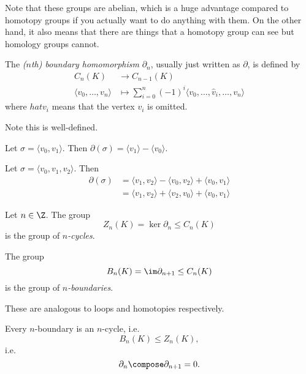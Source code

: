 \documentclass[a4paper]{article}
\renewcommand{\b}{\partial} %
\begin{document}
\begin{remark}
  Note that these groups are abelian, which is a huge advantage compared to homotopy groups if you actually want to do anything with them. On the other hand, it also means that there are things that a homotopy group can see but homology groups cannot.
\end{remark}

\begin{definition}
  The \emph{(\(n\)th) boundary homomorphism} \(\b_n\), usually just written as \(\b\), is defined by
  \begin{align*}
    C_n(K) &\to C_{n - 1}(K) \\
    \langle v_0, \dots, v_n \rangle &\mapsto \sum_{i = 0}^n (-1)^i \langle v_0, \dots, \hat v_i, \dots, v_n \rangle
  \end{align*}
  where \(hat v_i\) means that the vertex \(v_i\) is omitted.
\end{definition}

Note this is well-defined.

\begin{eg}
  Let \(\sigma = \langle v_0, v_1 \rangle\). Then \(\b(\sigma) = \langle v_1 \rangle - \langle v_0 \rangle\).
\end{eg}

\begin{eg}
  Let \(\sigma = \langle v_0, v_1, v_2 \rangle\). Then
  \begin{align*}
    \b(\sigma)
    &= \langle v_1, v_2 \rangle - \langle v_0, v_2 \rangle + \langle v_0, v_1 \rangle \\
    &= \langle v_1, v_2 \rangle + \langle v_2, v_0 \rangle + \langle v_0, v_1 \rangle
  \end{align*}
\end{eg}

\begin{definition}
  Let \(n \in \Z\). The group
  \[
    Z_n(K) = \ker \b_n \leq C_n(K)
  \]
  is the group of \emph{\(n\)-cycles}.
  
  The group
  \[
    B_n(K) = \im \b_{n + 1} \leq C_n(K)
  \]
  is the group of \emph{\(n\)-boundaries}.
\end{definition}

These are analogous to loops and homotopies respectively.

\begin{lemma}
  Every \(n\)-boundary is an \(n\)-cycle, i.e.
  \[
    B_n(K) \leq Z_n(K),
  \]
  i.e.
  \[
    \b_n \compose \b_{n + 1} = 0.
  \]
\end{lemma}
\end{document}

